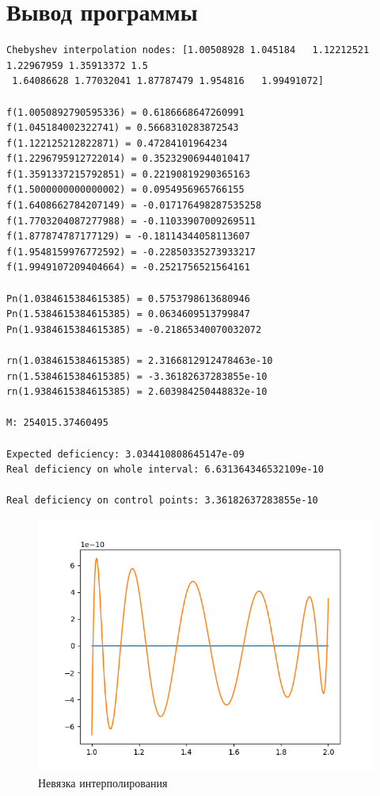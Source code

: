 \documentclass[14pt, a4paper]{article}
\begin{document}
  \section{Вывод программы}
\begin{verbatim}
Chebyshev interpolation nodes: [1.00508928 1.045184   1.12212521 1.22967959 1.35913372 1.5
 1.64086628 1.77032041 1.87787479 1.954816   1.99491072]

f(1.0050892790595336) = 0.6186668647260991
f(1.045184002322741) = 0.5668310283872543
f(1.122125212822871) = 0.47284101964234
f(1.2296795912722014) = 0.35232906944010417
f(1.3591337215792851) = 0.22190819290365163
f(1.5000000000000002) = 0.0954956965766155
f(1.6408662784207149) = -0.017176498287535258
f(1.7703204087277988) = -0.11033907009269511
f(1.877874787177129) = -0.18114344058113607
f(1.9548159976772592) = -0.22850335273933217
f(1.9949107209404664) = -0.2521756521564161

Pn(1.0384615384615385) = 0.5753798613680946
Pn(1.5384615384615385) = 0.0634609513799847
Pn(1.9384615384615385) = -0.21865340070032072

rn(1.0384615384615385) = 2.3166812912478463e-10
rn(1.5384615384615385) = -3.36182637283855e-10
rn(1.9384615384615385) = 2.603984250448832e-10

M: 254015.37460495

Expected deficiency: 3.034410808645147e-09
Real deficiency on whole interval: 6.631364346532109e-10

Real deficiency on control points: 3.36182637283855e-10
\end{verbatim}
\begin{figure}[h!]
  \center
  \includegraphics[width=0.6\linewidth]{ChebyshevDiff.png}
  \caption{Невязка интерполирования}
\end{figure}
\end{document}

